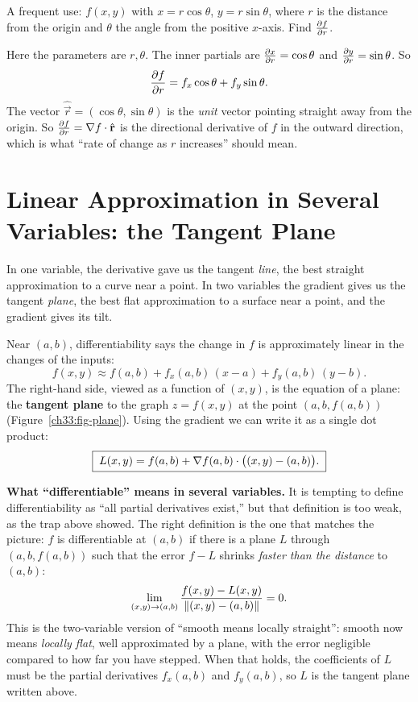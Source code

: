 \begin{example}
\label{ch33:ex-polar}
A frequent use: $f(x,y)$ with $x=r\cos\theta$, $y=r\sin\theta$, where $r$ is
the distance from the origin and $\theta$ the angle from the positive $x$-axis.
Find $\frac{\partial f}{\partial r}$.

Here the parameters are $r,\theta$. The inner partials are
$\frac{\partial x}{\partial r}=\cos\theta$ and $\frac{\partial y}{\partial r}=\sin\theta$. So
\[
  \frac{\partial f}{\partial r} = f_x\cos\theta + f_y\sin\theta.
\]
The vector $\hat{\vec r}=(\cos\theta,\sin\theta)$ is the \emph{unit} vector
pointing straight away from the origin. So $\frac{\partial f}{\partial r} = \nabla f \cdot \hat{\mathbf{r}}$
is the directional derivative of $f$ in the outward direction, which is what
``rate of change as $r$ increases'' should mean.
\end{example}

\section{Linear Approximation in Several Variables: the Tangent Plane}
\label{ch33:tangentplane}

In one variable, the derivative gave us the tangent \emph{line}, the best straight
approximation to a curve near a point. In two variables the gradient gives us the
tangent \emph{plane}, the best flat approximation to a surface near a point, and
the gradient gives its tilt.

Near $(a,b)$, differentiability says the change in $f$ is approximately linear in
the changes of the inputs:
\[
  f(x,y) \approx f(a,b) + f_x(a,b)\,(x-a) + f_y(a,b)\,(y-b).
\]
The right-hand side, viewed as a function of $(x,y)$, is the equation of a plane:
the \textbf{tangent plane} to the graph $z=f(x,y)$ at the point $(a,b,f(a,b))$
(Figure~\ref{ch33:fig-plane}).
Using the gradient we can write it as a single dot product:
\[
  \boxed{\;L(x,y) = f(a,b) + \nabla f(a,b)\cdot\big((x,y)-(a,b)\big).\;}
\]

\begin{happeningbox}
\textbf{What ``differentiable'' means in several variables.} It is tempting
to define differentiability as ``all partial derivatives exist,'' but that
definition is too weak, as the trap above showed. The right definition is the one
that matches the picture: $f$ is differentiable at $(a,b)$ if there is a plane $L$
through $(a,b,f(a,b))$ such that the error $f-L$ shrinks \emph{faster than the
distance} to $(a,b)$:
\[
  \lim_{(x,y)\to(a,b)}\frac{f(x,y)-L(x,y)}{\lVert(x,y)-(a,b)\rVert} = 0.
\]
This is the two-variable version of ``smooth means locally straight'': smooth
now means \emph{locally flat}, well approximated by a plane, with the error
negligible compared to how far you have stepped. When that holds, the coefficients
of $L$ must be the partial derivatives $f_x(a,b)$ and $f_y(a,b)$, so $L$ is the
tangent plane written above.
\end{happeningbox}

